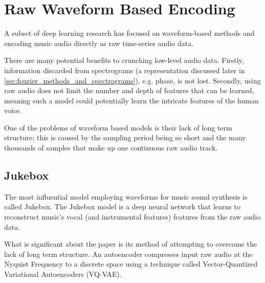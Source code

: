 \section{Raw Waveform Based Encoding}

A subset of deep learning research has focused on waveform-based methods and encoding music audio directly as raw time-series audio data.

\vspace{0.5cm}
\vspace{0.5cm}

There are many potential benefits to crunching low-level audio data. Firstly, information discarded from spectrograms (a representation discussed later in \ref{sec:fourier_methods_and_spectrograms}), e.g. phase, is not lost. Secondly, using raw audio does not limit the number and depth of features that can be learned, meaning such a model could potentially learn the intricate features of the human voice.

One of the problems of waveform based models is their lack of long term structure; this is caused by the sampling period being so short and the many thousands of samples that make up one continuous raw audio track\cite{JukeboxWebsite}.

\subsection{Jukebox}
\label{sec:jukebox}

The most influential model employing waveforms for music sound synthesis is called Jukebox\cite{Jukebox}. The Jukebox model is a deep neural network that learns to reconstruct music's vocal (and instrumental features) features from the raw audio data.

What is significant about the paper is its method of attempting to overcome the lack of long term structure. An autoencoder compresses input raw audio at the Nyquist Frequency to a discrete space using a technique called Vector-Quantized Variational Autoencoders (VQ-VAE)\cite{Jukebox}.

\vspace{0.5cm}
\vspace{0.5cm}

